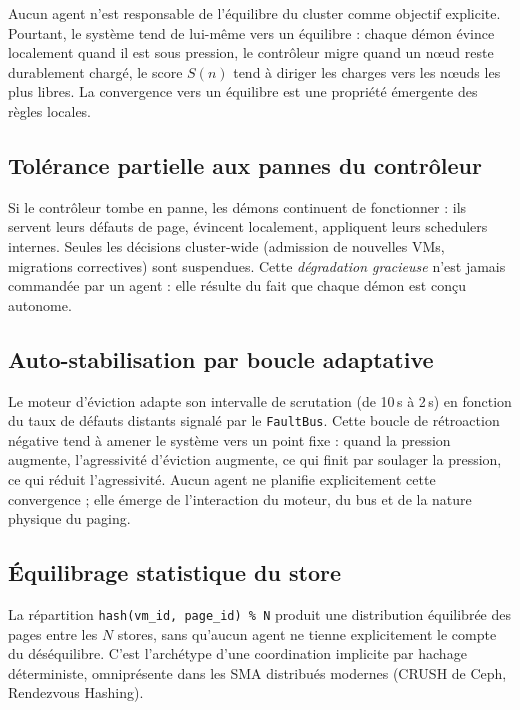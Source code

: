 Aucun agent n'est responsable de \og{}l'équilibre du cluster\fg{} comme objectif explicite. Pourtant, le système tend de lui-même vers un équilibre : chaque démon évince localement quand il est sous pression, le contrôleur migre quand un nœud reste durablement chargé, le score $S(n)$ tend à diriger les charges vers les nœuds les plus libres. La convergence vers un équilibre est une propriété émergente des règles locales.

\subsection{Tolérance partielle aux pannes du contrôleur}

Si le contrôleur tombe en panne, les démons continuent de fonctionner : ils servent leurs défauts de page, évincent localement, appliquent leurs schedulers internes. Seules les décisions cluster-wide (admission de nouvelles VMs, migrations correctives) sont suspendues. Cette \emph{dégradation gracieuse} n'est jamais commandée par un agent : elle résulte du fait que chaque démon est conçu autonome.

\subsection{Auto-stabilisation par boucle adaptative}

Le moteur d'éviction adapte son intervalle de scrutation (de 10\,s à 2\,s) en fonction du taux de défauts distants signalé par le \texttt{FaultBus}. Cette boucle de rétroaction négative tend à amener le système vers un point fixe : quand la pression augmente, l'agressivité d'éviction augmente, ce qui finit par soulager la pression, ce qui réduit l'agressivité. Aucun agent ne planifie explicitement cette convergence ; elle émerge de l'interaction du moteur, du bus et de la nature physique du paging.

\subsection{Équilibrage statistique du store}

La répartition \texttt{hash(vm\_id, page\_id) \% N} produit une distribution équilibrée des pages entre les $N$ stores, sans qu'aucun agent ne tienne explicitement \og{}le compte\fg{} du déséquilibre. C'est l'archétype d'une coordination implicite par hachage déterministe, omniprésente dans les SMA distribués modernes (CRUSH de Ceph, Rendezvous Hashing).

